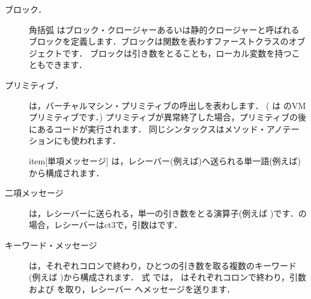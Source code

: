 \documentclass[a4paper,10pt,twoside]{book}
\begin{document}
\begin{description}
\item[ブロック．] 角括弧 \ct{[ ]} はブロック・クロージャーあるいは静的クロージャーと呼ばれるブロックを定義します．ブロックは関数を表わすファーストクラスのオブジェクトです．
	ブロックは引き数をとることも，ローカル変数を持つこともできます．

\item[プリミティブ．] は，バーチャルマシン・プリミティブの呼出しを表わします．
	( は のVMプリミティブです．)
	プリミティブが異常終了した場合，プリミティブの後にあるコードが実行されます．
	同じシンタックスはメソッド・アノテーションにも使われます．

item[単項メッセージ] は，レシーバー(例えば)へ送られる単一語(例えば)から構成されます．

\item[二項メッセージ] は，レシーバーに送られる，単一の引き数をとる演算子(例えば \ct{+})です．の場合，レシーバーはct{3}で，引数はです．

\item[キーワード・メッセージ]は，それぞれコロンで終わり，ひとつの引き数を取る複数のキーワード(例えば )から構成されます．
	式 では， はそれぞれコロンで終わり，引数  および  を取り，レシーバー  へメッセージを送ります．


\end{description}
\end{document}
